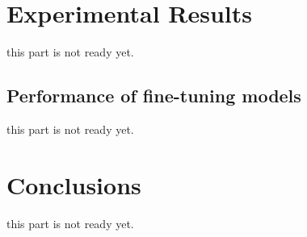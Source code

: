 \documentclass[sigconf]{acmart}
\begin{document}
\section{Experimental Results}\label{results}
this part is not ready yet.





\subsection{Performance of fine-tuning models}
this part is not ready yet.







\section{Conclusions}\label{conclusions}
this part is not ready yet.




 
\end{document}
